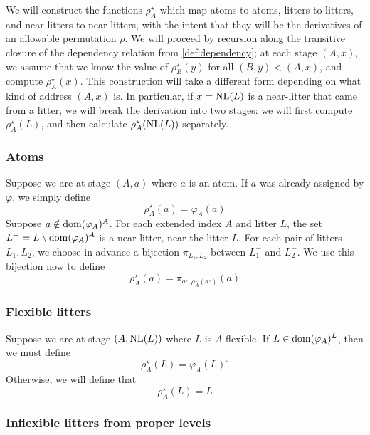 We will construct the functions \( \rho^\star_A \) which map atoms to atoms, litters to litters, and near-litters to near-litters, with the intent that they will be the derivatives of an allowable permutation \( \rho \).
We will proceed by recursion along the transitive closure of the dependency relation from \cref{def:dependency}; at each stage \( (A, x) \), we assume that we know the value of \( \rho^\star_B(y) \) for all \( (B, y) < (A, x) \), and compute \( \rho^\star_A(x) \).
This construction will take a different form depending on what kind of address \( (A, x) \) is.
In particular, if \( x = \operatorname{NL}(L) \) is a near-litter that came from a litter, we will break the derivation into two stages: we will first compute \( \rho^\star_A(L) \), and then calculate \( \rho^\star_A(\operatorname{NL}(L)) \) separately.

\subsubsection{Atoms}

Suppose we are at stage \( (A, a) \) where \( a \) is an atom.
If \( a \) was already assigned by \( \varphi \), we simply define
\[ \rho^\star_A(a) = \varphi_A(a) \]
Suppose \( a \notin \operatorname{dom} (\varphi_A)^A \).
For each extended index \( A \) and litter \( L \), the set \( L^- = L \setminus \operatorname{dom} (\varphi_A)^A \) is a near-litter, near the litter \( L \).
For each pair of litters \( L_1, L_2 \), we choose in advance a bijection \( \pi_{L_1,L_2} \) between \( L_1^- \) and \( L_2^- \).
We use this bijection now to define
\[ \rho^\star_A(a) = \pi_{a^\circ,\rho^\star_A(a^\circ)}(a) \]

\subsubsection{Flexible litters}
\label{ss:foa:flexible}

Suppose we are at stage \( (A, \operatorname{NL}(L)) \) where \( L \) is \( A \)-flexible.
If \( L \in \operatorname{dom} (\varphi_A)^L \), then we must define
\[ \rho^\star_A(L) = \varphi_A(L)^\circ \]
Otherwise, we will define that
\[ \rho^\star_A(L) = L \]

\subsubsection{Inflexible litters from proper levels}
\label{ss:foa:inflexible_coe}

